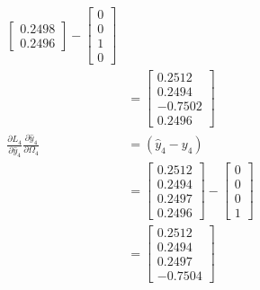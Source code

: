 \documentclass{article}
\begin{document}
\begin{align*}
\begin{bmatrix}
0.2498 \\
0.2496
\end{bmatrix} - \begin{bmatrix} 0 \\ 0 \\ 1 \\ 0 \end{bmatrix}\\
&= \begin{bmatrix}
0.2512 \\
0.2494 \\
-0.7502 \\
0.2496
\end{bmatrix}\\
\frac{\partial L_4}{\partial \hat{y}_4}\frac{\partial \hat{y}_4}{\partial \Omega_4} &= (\hat{y}_{4}-y_{4})\\
&=\begin{bmatrix}
0.2512 \\
0.2494 \\
0.2497 \\
0.2496
\end{bmatrix}-\begin{bmatrix} 0 \\ 0 \\ 0 \\ 1 \end{bmatrix} \\
&= \begin{bmatrix}
0.2512 \\
0.2494 \\
0.2497 \\
-0.7504
\end{bmatrix}
\end{align*}
\end{document}
